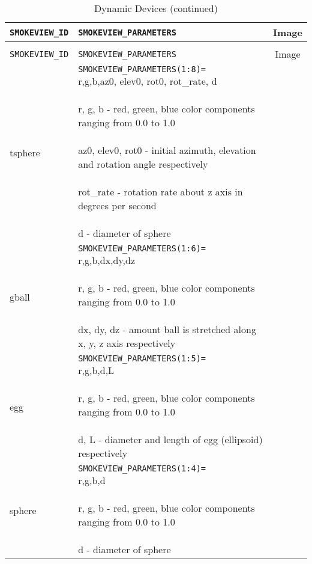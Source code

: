 \begin{longtable}[ht]{|l|l|c|}
\caption{Dynamic Devices}
\label{tab:devices_dynamic}
\\ \hline
{\tt SMOKEVIEW\_ID}  & {\tt SMOKEVIEW\_PARAMETERS} & Image  \\ \hline \hline
\endfirsthead
\caption{Dynamic Devices (continued)}
\\ \hline
{\tt SMOKEVIEW\_ID}  & {\tt SMOKEVIEW\_PARAMETERS} & Image  \\ \hline \hline
\endhead

tsphere&
\parbox[c]{\boxwidth}{
{\tt SMOKEVIEW\_PARAMETERS(1:8)=}\\
r,g,b,az0, elev0, rot0, rot\_rate, d\\ \\
r, g, b - red, green, blue color components ranging from 0.0 to 1.0\\ \\
az0, elev0, rot0 - initial azimuth, elevation and rotation angle respectively\\ \\
rot\_rate - rotation rate about z axis in degrees per second\\ \\
d - diameter of sphere
} &
 \\ \hline

gball&
\parbox[c]{\boxwidth}{
{\tt SMOKEVIEW\_PARAMETERS(1:6)=}\\
r,g,b,dx,dy,dz\\ \\
r, g, b - red, green, blue color components ranging from 0.0 to 1.0 \\ \\
dx, dy, dz - amount ball is stretched along x, y, z axis respectively
} &
 \\ \hline

egg&
\parbox[c]{\boxwidth}{
{\tt SMOKEVIEW\_PARAMETERS(1:5)=}\\
r,g,b,d,L\\ \\
r, g, b - red, green, blue color components ranging from 0.0 to 1.0 \\ \\
d, L - diameter and length of egg (ellipsoid) respectively
} &
 \\ \hline

sphere&
\parbox[c]{\boxwidth}{
{\tt SMOKEVIEW\_PARAMETERS(1:4)=}\\
r,g,b,d\\ \\
r, g, b - red, green, blue color components ranging from 0.0 to 1.0 \\ \\
d - diameter of sphere
} &
 \\ \hline


\end{longtable}
